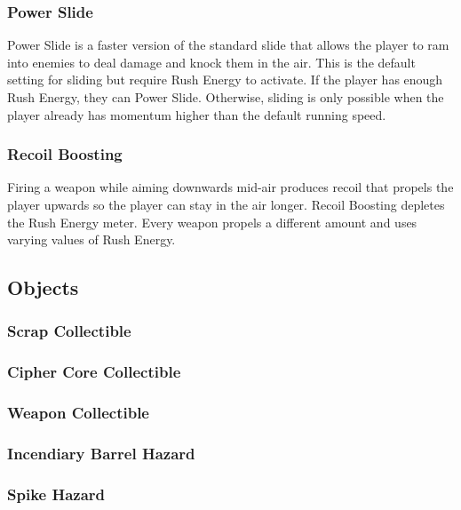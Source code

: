 \documentclass[12pt]{article}
\begin{document}
\subsubsection{Power Slide}

Power Slide is a faster version of the standard slide that allows the player to ram into enemies to deal damage and knock them in the air. This is the default setting for sliding but require Rush Energy to activate. If the player has enough Rush Energy, they can Power Slide. Otherwise, sliding is only possible when the player already has momentum higher than the default running speed. 

\subsubsection{Recoil Boosting}

Firing a weapon while aiming downwards mid-air produces recoil that propels the player upwards so the player can stay in the air longer. Recoil Boosting depletes the Rush Energy meter. Every weapon propels a different amount and uses varying values of Rush Energy. 

\subsection{Objects}

\subsubsection{Scrap Collectible}

\subsubsection{Cipher Core Collectible}

\subsubsection{Weapon Collectible}

\subsubsection{Incendiary Barrel Hazard}

\subsubsection{Spike Hazard}
\end{document}
